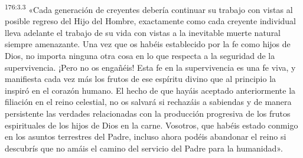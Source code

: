 \par 
\textsuperscript{176:3.3} «Cada generación de creyentes debería continuar su trabajo con vistas al posible regreso del Hijo del Hombre, exactamente como cada creyente individual lleva adelante el trabajo de su vida con vistas a la inevitable muerte natural siempre amenazante. Una vez que os habéis establecido por la fe como hijos de Dios, no importa ninguna otra cosa en lo que respecta a la seguridad de la supervivencia. ¡Pero no os engañéis! Esta fe en la supervivencia es una fe viva, y manifiesta cada vez más los frutos de ese espíritu divino que al principio la inspiró en el corazón humano. El hecho de que hayáis aceptado anteriormente la filiación en el reino celestial, no os salvará si rechazáis a sabiendas y de manera persistente las verdades relacionadas con la producción progresiva de los frutos espirituales de los hijos de Dios en la carne. Vosotros, que habéis estado conmigo en los asuntos terrestres del Padre, incluso ahora podéis abandonar el reino si descubrís que no amáis el camino del servicio del Padre para la humanidad».

